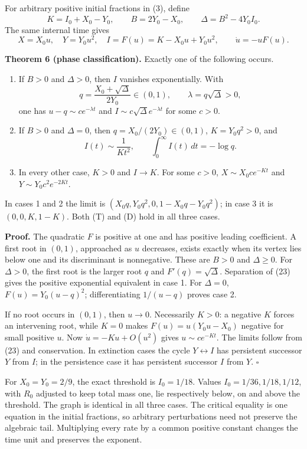 \documentclass[
  11pt,
  a4paper,
]{scrartcl}
\providecommand{\tightlist}{%
  \setlength{\itemsep}{0pt}\setlength{\parskip}{0pt}}
\begin{document}
For arbitrary positive initial fractions in (3), define \[
K=I_0+X_0-Y_0,\qquad B=2Y_0-X_0,\qquad
\Delta=B^2-4Y_0I_0.
\tag{22}
\] The same internal time gives \[
X=X_0u,\quad Y=Y_0u^2,\quad
I=F(u)=K-X_0u+Y_0u^2,\qquad \dot u=-uF(u).
\tag{23}
\]

\textbf{Theorem 6 (phase classification).} Exactly one of the following
occurs.

\begin{enumerate}
\def\labelenumi{\arabic{enumi}.}
\tightlist
\item
  If \(B>0\) and \(\Delta>0\), then \(I\) vanishes exponentially. With
  \[
  q=\frac{X_0+\sqrt\Delta}{2Y_0}\in(0,1),\qquad
  \lambda=q\sqrt\Delta>0,
  \] one has \(u-q\sim c e^{-\lambda t}\) and
  \(I\sim c\sqrt\Delta e^{-\lambda t}\) for some \(c>0\).
\item
  If \(B>0\) and \(\Delta=0\), then \(q=X_0/(2Y_0)\in(0,1)\),
  \(K=Y_0q^2>0\), and \[
  I(t)\sim\frac1{Kt^2},\qquad \int_0^\infty I(t)\,dt=-\log q.
  \]
\item
  In every other case, \(K>0\) and \(I\to K\). For some \(c>0\),
  \(X\sim X_0c e^{-Kt}\) and \(Y\sim Y_0c^2e^{-2Kt}\).
\end{enumerate}

In cases 1 and 2 the limit is \((X_0q,Y_0q^2,0,1-X_0q-Y_0q^2)\); in case
3 it is \((0,0,K,1-K)\). Both (T) and (D) hold in all three cases.

\textbf{Proof.} The quadratic \(F\) is positive at one and has positive
leading coefficient. A first root in \((0,1)\), approached as \(u\)
decreases, exists exactly when its vertex lies below one and its
discriminant is nonnegative. These are \(B>0\) and \(\Delta\ge0\). For
\(\Delta>0\), the first root is the larger root \(q\) and
\(F'(q)=\sqrt\Delta\). Separation of (23) gives the positive exponential
equivalent in case 1. For \(\Delta=0\), \(F(u)=Y_0(u-q)^2\);
differentiating \(1/(u-q)\) proves case 2.

If no root occurs in \((0,1)\), then \(u\to0\). Necessarily \(K>0\): a
negative \(K\) forces an intervening root, while \(K=0\) makes
\(F(u)=u(Y_0u-X_0)\) negative for small positive \(u\). Now
\(\dot u=-Ku+O(u^2)\) gives \(u\sim c e^{-Kt}\). The limits follow from
(23) and conservation. In extinction cases the cycle
\(Y\leftrightarrow I\) has persistent successor \(Y\) from \(I\); in the
persistence case it has persistent successor \(I\) from \(Y\).
\(\square\)

For \(X_0=Y_0=2/9\), the exact threshold is \(I_0=1/18\). Values
\(I_0=1/36,1/18,1/12\), with \(R_0\) adjusted to keep total mass one,
lie respectively below, on and above the threshold. The graph is
identical in all three cases. The critical equality is one equation in
the initial fractions, so arbitrary perturbations need not preserve the
algebraic tail. Multiplying every rate by a common positive constant
changes the time unit and preserves the exponent.
\end{document}
